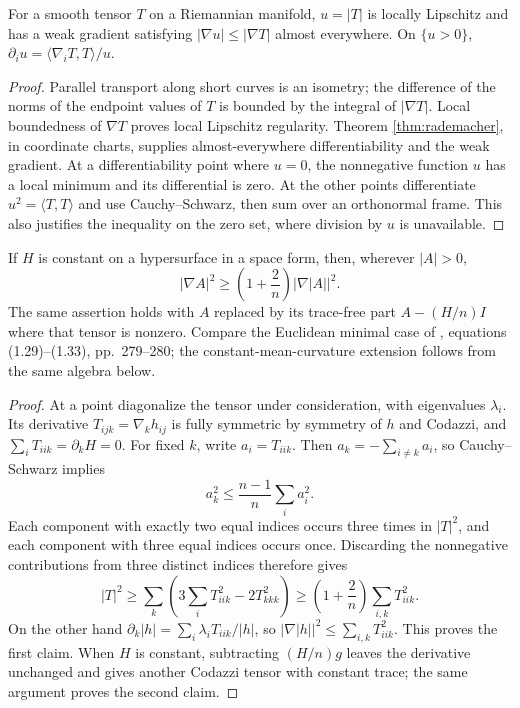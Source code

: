 \begin{lemma}\label{lem:tensor-kato}
For a smooth tensor $T$ on a Riemannian manifold, $u=|T|$ is locally Lipschitz and has a weak gradient satisfying $|\nabla u|\leq|\nabla T|$ almost everywhere. On $\{u>0\}$,
$\partial_i u=\langle\nabla_iT,T\rangle/u$.
\end{lemma}
\begin{proof}
Parallel transport along short curves is an isometry; the difference of the norms of the endpoint values of $T$ is bounded by the integral of $|\nabla T|$. Local boundedness of $\nabla T$ proves local Lipschitz regularity. Theorem \ref{thm:rademacher}, in coordinate charts, supplies almost-everywhere differentiability and the weak gradient. At a differentiability point where $u=0$, the nonnegative function $u$ has a local minimum and its differential is zero. At the other points differentiate $u^2=\langle T,T\rangle$ and use Cauchy--Schwarz, then sum over an orthonormal frame. This also justifies the inequality on the zero set, where division by $u$ is unavailable.
\end{proof}

\begin{lemma}\label{lem:cmc-improved-kato}
If $H$ is constant on a hypersurface in a space form, then, wherever $|A|>0$,
\[
 |\nabla A|^2\geq\left(1+\frac2n\right)|\nabla|A||^2.
\]
The same assertion holds with $A$ replaced by its trace-free part $A-(H/n)I$ where that tensor is nonzero. Compare the Euclidean minimal case of \cite{SSY75}, equations (1.29)--(1.33), pp.~279--280; the constant-mean-curvature extension follows from the same algebra below.
\end{lemma}
\begin{proof}
At a point diagonalize the tensor under consideration, with eigenvalues $\lambda_i$. Its derivative $T_{ijk}=\nabla_kh_{ij}$ is fully symmetric by symmetry of $h$ and Codazzi, and $\sum_iT_{iik}=\partial_kH=0$. For fixed $k$, write $a_i=T_{iik}$. Then $a_k=-\sum_{i\ne k}a_i$, so Cauchy--Schwarz implies
\[
 a_k^2\leq\frac{n-1}{n}\sum_i a_i^2.
\]
Each component with exactly two equal indices occurs three times in $|T|^2$, and each component with three equal indices occurs once. Discarding the nonnegative contributions from three distinct indices therefore gives
\[
 |T|^2\geq\sum_k\left(3\sum_iT_{iik}^2-2T_{kkk}^2\right)
 \geq\left(1+\frac2n\right)\sum_{i,k}T_{iik}^2.
\]
On the other hand $\partial_k|h|=\sum_i\lambda_iT_{iik}/|h|$, so $|\nabla|h||^2\leq\sum_{i,k}T_{iik}^2$. This proves the first claim. When $H$ is constant, subtracting $(H/n)g$ leaves the derivative unchanged and gives another Codazzi tensor with constant trace; the same argument proves the second claim.
\end{proof}

